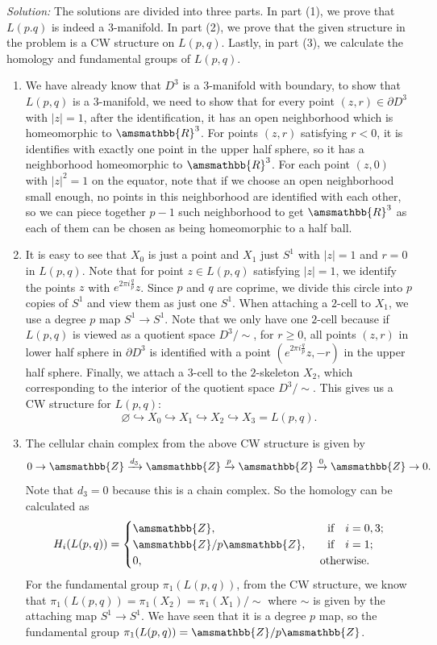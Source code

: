 \documentclass[letterpaper, 12pt]{article}
\newenvironment{solution}
		{\textit{Solution:}}
		{}
\renewcommand{\mathbb}{\amsmathbb}
\newcommand{\iif}{\ \ \ \text{if}\ \ \ }
\newcommand{\otherwise}{\text{otherwise}}
\begin{document}
\begin{solution}
The solutions are divided into three parts. In part (1), we prove that \(L(p.q)\) is indeed a \(3\)-manifold. In part (2), we prove that the given structure in the problem is a CW structure on \(L(p,q)\). Lastly, 
in part (3), we calculate the homology and fundamental groups of \(L(p,q)\).
\begin{enumerate}[(1)]
\item We have already know that \(D^3\) is a \(3\)-manifold with boundary, to show that \(L(p,q)\) is a \(3\)-manifold, we need to show that for every point \((z,r)\in \partial D^3\) with \(|z|=1\), after the identification, it has 
an open neighborhood which is homeomorphic to \(\mathbb{R}^3\). For points \((z,r)\) satisfying \(r< 0\), it is identifies with exactly one point in the upper half sphere, so it has  a neighborhood homeomorphic to \(\mathbb{R}^3\). For each 
point \((z,0)\) with \(|z|^2=1\) on the equator, note that if we choose an open neighborhood small enough, no points in this neighborhood are identified with each other, so we can piece together \(p-1\) such neighborhood to get \(\mathbb{R}^3\) as 
each of them can be chosen as being homeomorphic to a half ball.
\item It is easy to see that \(X_0\) is just a point and \(X_1\) just \(S^1\) with \(|z|=1\) and \(r=0\) in \(L(p,q)\). Note that for point \(z\in L(p,q)\) satisfying \(|z|=1\), we identify the points \(z\) with \(e^{2\pi i\frac{q}{p}}z\). Since \(p\) and \(q\) are 
coprime, we divide this circle into \(p\) copies of \(S^1\) and view them as just one \(S^1\). When attaching a \(2\)-cell to \(X_1\), we use a degree \(p\) map \(S^1\rightarrow S^1\). Note that we only have one \(2\)-cell because if \(L(p,q)\) is viewed as a quotient space \(D^3/\sim\), 
for \(r\geq 0\), all points \((z,r)\) in lower half sphere in \(\partial D^3\) is identified with a point \((e^{2\pi i \frac{q}{p}}z,-r)\) in the upper half sphere. Finally, we attach a \(3\)-cell to the \(2\)-skeleton \(X_2\), which corresponding to the interior of the quotient space \(D^3/\sim\). This gives us 
a CW structure for \(L(p,q)\):
\[\varnothing \hookrightarrow X_0\hookrightarrow X_1\hookrightarrow X_2\hookrightarrow X_3=L(p,q).\]
\item The cellular chain complex from the above CW structure is given by 
\[0\rightarrow \mathbb{Z}\xrightarrow{d_3}\mathbb{Z}\xrightarrow{p}\mathbb{Z}\xrightarrow{0}\mathbb{Z}\rightarrow 0.\]
Note that \(d_3=0\) because this is a chain complex. So the homology can be calculated as 
\[H_i(L(p,q))=\begin{cases}
    \mathbb{Z},&\iif i=0,3;\\ 
    \mathbb{Z}/ p \mathbb{Z},&\iif i=1;\\
    0,&\ \otherwise.
\end{cases}\]
For the fundamental group \(\pi_1(L(p,q))\), from the CW structure, we know that \(\pi_1(L(p,q))=\pi_1(X_2)=\pi_1(X_1)/\sim\) where \(\sim\) is given by the attaching map \(S^1\rightarrow S^1\). We have seen that it is a degree \(p\) map, so the fundamental group 
\(\pi_1(L(p,q))=\mathbb{Z}/p \mathbb{Z}\).
\end{enumerate}
\end{solution}
\end{document}
